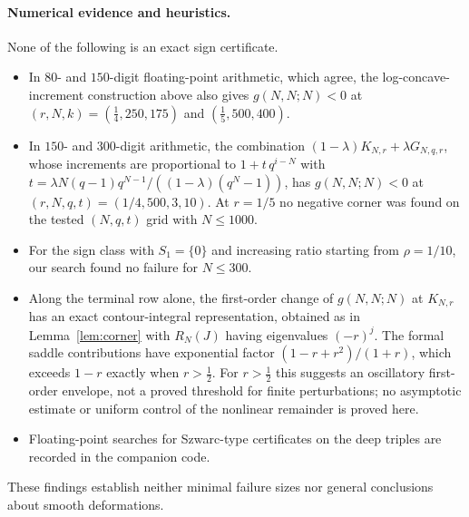 \paragraph{Numerical evidence and heuristics.} None of the following is an exact sign certificate.
\begin{itemize}
\item In $80$- and $150$-digit floating-point arithmetic, which agree, the log-concave-increment construction above also gives $g(N,N;N)<0$ at $(r,N,k)=(\tfrac14,250,175)$ and $(\tfrac15,500,400)$.
\item In $150$- and $300$-digit arithmetic, the combination $(1-\lambda)K_{N,r}+\lambda G_{N,q,r}$, whose increments are proportional to $1+t\,q^{i-N}$ with $t=\lambda N(q-1)q^{N-1}/((1-\lambda)(q^N-1))$, has $g(N,N;N)<0$ at $(r,N,q,t)=(1/4,500,3,10)$. At $r=1/5$ no negative corner was found on the tested $(N,q,t)$ grid with $N\leq1000$.
\item For the sign class with $S_1=\{0\}$ and increasing ratio starting from $\rho=1/10$, our search found no failure for $N\leq300$.
\item Along the terminal row alone, the first-order change of $g(N,N;N)$ at $K_{N,r}$ has an exact contour-integral representation, obtained as in Lemma~\ref{lem:corner} with $R_N(J)$ having eigenvalues $(-r)^j$. The formal saddle contributions have exponential factor $(1-r+r^2)/(1+r)$, which exceeds $1-r$ exactly when $r>\tfrac12$. For $r>\tfrac12$ this suggests an oscillatory first-order envelope, not a proved threshold for finite perturbations; no asymptotic estimate or uniform control of the nonlinear remainder is proved here.
\item Floating-point searches for Szwarc-type certificates on the deep triples are recorded in the companion code.
\end{itemize}
These findings establish neither minimal failure sizes nor general conclusions about smooth deformations.

